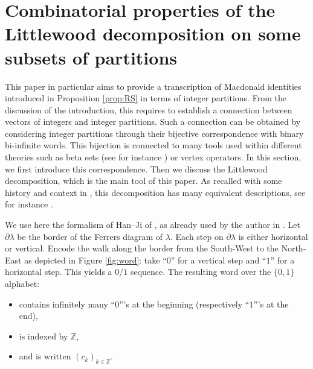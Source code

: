 \documentclass[11pt,letterpaper]{amsart}
\def\bbbz{\mathbb Z}
\numberwithin{equation}{section}
\numberwithin{df}{section}
\begin{document}
\section{Combinatorial properties of the Littlewood decomposition on some subsets of partitions} \label{sec:lit}


This paper in particular aims to provide a transcription of Macdonald identities introduced in Proposition \ref{prop:RS} in terms of integer partitions. From the discussion of the introduction, this requires to establish a connection between vectors of integers and integer partitions. Such a connection can be obtained by considering integer partitions through their bijective correspondence with binary bi-infinite words. This bijection is connected to many tools used within different theories such as beta sets (see for instance \cite{Albion,BN}) or vertex operators.
In this section, we first introduce this correspondence. Then we discuss the Littlewood decomposition, which is the main tool of this paper. As recalled with some history and context in \cite[Section $2.2$]{Albion}, this decomposition has many equivalent descriptions, see for instance \cite{GKS,HJ,WaW}. 


We use here the formalism of Han--Ji of \cite{HJ}, as already used by the author in \cite{Wmult,WFpsac}. Let $\partial \lambda$ be the border of the Ferrers diagram of $\lambda$. Each step on $\partial\lambda$ is either horizontal or vertical. Encode the walk along the border from the South-West to the North-East as depicted in Figure \ref{fig:word}: take ``$0$'' for a vertical step and ``$1$'' for a horizontal step. This yields a $0/1$ sequence. The resulting word over the $\lbrace 0,1\rbrace$ alphabet:
\begin{itemize}
\item contains infinitely many ``$0$'''s at the beginning (respectively ``$1$'''s at the end),
\item is indexed by $\bbbz$,
\item and is written $(c_k)_{k\in\mathbb{Z}}$.
\end{itemize}
 
\end{document}
